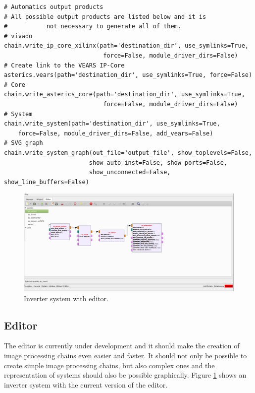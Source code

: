 \begin{lstlisting}[style=AutomaticsPython, label=Code:06-05-system-from-scratch-output-product, caption=Script: Output product of systems created with the wizard from scratch]
# Automatics output products 
# All possible output products are listed below and it is 
#			not necessary to generate all of them.
# vivado
chain.write_ip_core_xilinx(path='destination_dir', use_symlinks=True, 
							force=False, module_driver_dirs=False)
# Create link to the VEARS IP-Core
asterics.vears(path='destination_dir', use_symlinks=True, force=False)
# Core
chain.write_asterics_core(path='destination_dir', use_symlinks=True, 
							force=False, module_driver_dirs=False)
# System
chain.write_system(path='destination_dir', use_symlinks=True, 
	force=False, module_driver_dirs=False, add_vears=False)
# SVG graph
chain.write_system_graph(out_file='output_file', show_toplevels=False, 
						show_auto_inst=False, show_ports=False, 
						show_unconnected=False, show_line_buffers=False)
\end{lstlisting}
\begin{figure}[h]
	\centering
	\includegraphics[width=\textwidth]{figs/gui/editor}
	\caption{Inverter system with editor.}
	\label{fig:editor}
\end{figure}
	\subsection{Editor}\label{sec:06-05-editor}
		The editor is currently under development and it should make the creation of image processing chains even easier and faster. It should not only be possible to create simple image processing chains, but also complex ones and the representation of systems should also be possible graphically. Figure \ref{fig:editor} shows an inverter system with the current version of the editor.
	\newpage	
		
		

